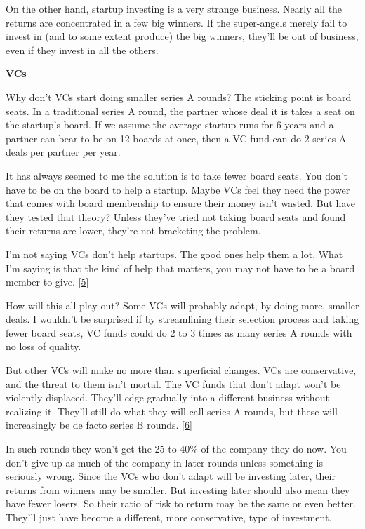 On the other hand, startup investing is a very strange business. Nearly
all the returns are concentrated in a few big winners. If the
super-angels merely fail to invest in (and to some extent produce) the
big winners, they'll be out of business, even if they invest in all the
others.

\textbf{VCs}

Why don't VCs start doing smaller series A rounds? The sticking point is
board seats. In a traditional series A round, the partner whose deal it
is takes a seat on the startup's board. If we assume the average startup
runs for 6 years and a partner can bear to be on 12 boards at once, then
a VC fund can do 2 series A deals per partner per year.

It has always seemed to me the solution is to take fewer board seats.
You don't have to be on the board to help a startup. Maybe VCs feel they
need the power that comes with board membership to ensure their money
isn't wasted. But have they tested that theory? Unless they've tried not
taking board seats and found their returns are lower, they're not
bracketing the problem.

I'm not saying VCs don't help startups. The good ones help them a lot.
What I'm saying is that the kind of help that matters, you may not have
to be a board member to give. {[}\hyperref[f5n]{5}{]}

How will this all play out? Some VCs will probably adapt, by doing more,
smaller deals. I wouldn't be surprised if by streamlining their
selection process and taking fewer board seats, VC funds could do 2 to 3
times as many series A rounds with no loss of quality.

But other VCs will make no more than superficial changes. VCs are
conservative, and the threat to them isn't mortal. The VC funds that
don't adapt won't be violently displaced. They'll edge gradually into a
different business without realizing it. They'll still do what they will
call series A rounds, but these will increasingly be de facto series B
rounds. {[}\hyperref[f6n]{6}{]}

In such rounds they won't get the 25 to 40\% of the company they do now.
You don't give up as much of the company in later rounds unless
something is seriously wrong. Since the VCs who don't adapt will be
investing later, their returns from winners may be smaller. But
investing later should also mean they have fewer losers. So their ratio
of risk to return may be the same or even better. They'll just have
become a different, more conservative, type of investment.

